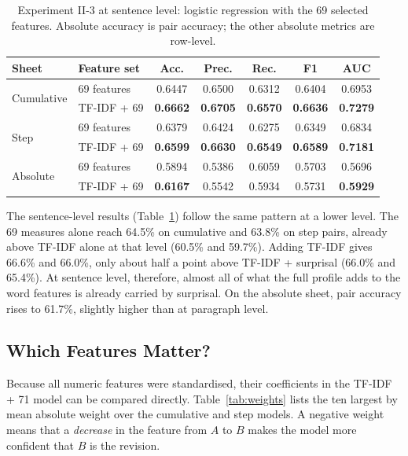 \documentclass[12pt,a4paper,oneside]{report}
\begin{document}
\begin{table}[ht]
\centering
\small
\caption[Experiment II-3: logistic regression with 69 features (sentence level)]{Experiment II-3 at sentence level: logistic regression with the 69 selected features. Absolute accuracy is pair accuracy; the other absolute metrics are row-level.}
\label{tab:exp3-sent}
\begin{tabular}{@{}llccccc@{}}
\toprule
Sheet & Feature set & Acc. & Prec. & Rec. & F1 & AUC\\
\midrule
\multirow{2}{*}{Cumulative} & 69 features & 0.6447 & 0.6500 & 0.6312 & 0.6404 & 0.6953\\
 & TF-IDF + 69 & \textbf{0.6662} & \textbf{0.6705} & \textbf{0.6570} & \textbf{0.6636} & \textbf{0.7279}\\
\midrule
\multirow{2}{*}{Step} & 69 features & 0.6379 & 0.6424 & 0.6275 & 0.6349 & 0.6834\\
 & TF-IDF + 69 & \textbf{0.6599} & \textbf{0.6630} & \textbf{0.6549} & \textbf{0.6589} & \textbf{0.7181}\\
\midrule
\multirow{2}{*}{Absolute} & 69 features & 0.5894 & 0.5386 & 0.6059 & 0.5703 & 0.5696\\
 & TF-IDF + 69 & \textbf{0.6167} & 0.5542 & 0.5934 & 0.5731 & \textbf{0.5929}\\
\bottomrule
\end{tabular}
\end{table}

The sentence-level results (Table~\ref{tab:exp3-sent}) follow the same pattern at a lower level. The 69 measures alone reach 64.5\% on cumulative and 63.8\% on step pairs, already above TF-IDF alone at that level (60.5\% and 59.7\%). Adding TF-IDF gives 66.6\% and 66.0\%, only about half a point above TF-IDF + surprisal (66.0\% and 65.4\%). At sentence level, therefore, almost all of what the full profile adds to the word features is already carried by surprisal. On the absolute sheet, pair accuracy rises to 61.7\%, slightly higher than at paragraph level.

\subsection{Which Features Matter?}
Because all numeric features were standardised, their coefficients in the TF-IDF + 71 model can be compared directly. Table~\ref{tab:weights} lists the ten largest by mean absolute weight over the cumulative and step models. A negative weight means that a \emph{decrease} in the feature from $A$ to $B$ makes the model more confident that $B$ is the revision.
\end{document}
